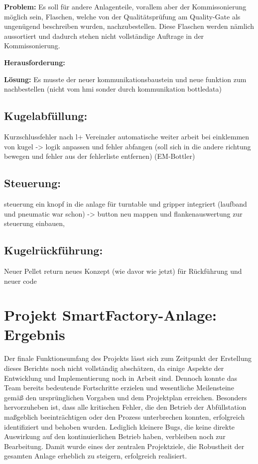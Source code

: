 \textbf{Problem:}  
Es soll für andere Anlagenteile, vorallem aber der Kommissonierung möglich sein, Flaschen, welche von der Qualitätsprüfung am Quality-Gate als ungenügend beschreiben wurden, nachzubestellen. Diese Flaschen werden nämlich aussortiert und dadurch stehen nicht vollständige Auftrage in der Kommissonierung.

\textbf{Herausforderung:} 


\textbf{Lösung:}  
Es musste der neuer kommunikationsbaustein und neue funktion zum nachbestellen (nicht vom hmi sonder durch kommunikation bottledata)

\subsection{Kugelabfüllung:} 
Kurzschlussfehler nach l+
Vereinzler automatische weiter arbeit bei einklemmen von kugel -> logik anpassen und fehler abfangen (soll sich in die andere richtung bewegen und fehler aus der fehlerliste entfernen) (EM-Bottler)

\subsection{Steuerung:}
steuerung ein knopf in die anlage für turntable und gripper integriert (laufband und pneumatic war schon) -> button neu mappen und flankenauswertung zur steuerung einbauen, 

\subsection{Kugelrückführung:}

Neuer Pellet return neues Konzept (wie davor wie jetzt) für Rückführung und neuer code

\section{Projekt SmartFactory-Anlage: Ergebnis}\label{sec:Projekt SmartFactory-Anlage: Ergebnis}

Der finale Funktionsumfang des Projekts lässt sich zum Zeitpunkt der Erstellung dieses Berichts noch nicht vollständig abschätzen, da einige 
Aspekte der Entwicklung und Implementierung noch in Arbeit sind. Dennoch konnte das Team bereits bedeutende Fortschritte erzielen und wesentliche 
Meilensteine gemäß den ursprünglichen Vorgaben und dem Projektplan erreichen. Besonders hervorzuheben ist, dass alle kritischen Fehler, die den 
Betrieb der Abfüllstation maßgeblich beeinträchtigen oder den Prozess unterbrechen konnten, erfolgreich identifiziert und behoben wurden. 
Lediglich kleinere Bugs, die keine direkte Auswirkung auf den kontinuierlichen Betrieb haben, verbleiben noch zur Bearbeitung. Damit wurde 
eines der zentralen Projektziele, die Robustheit der gesamten Anlage erheblich zu steigern, erfolgreich realisiert.

